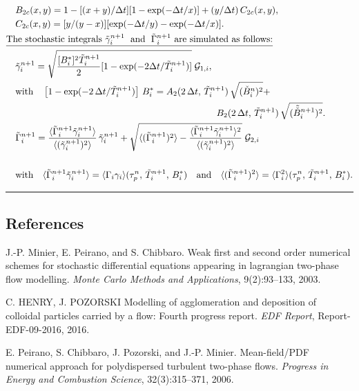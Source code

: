 \begin{table}[htbp]
\begin{align}
& \quad B_{2c}(x,y) =  1 - [(x+y)/\Delta t][1-\exp(-\Delta t/x)]
+ (y/\Delta t)\,C_{2c}(x,y), \notag\\
& \quad C_{2c}(x,y) = [y/(y-x)][\exp(-\Delta t/y)-\exp(-\Delta
  t/x)].\notag \\
& \text{\underline{The stochastic integrals
        $\tilde{\gamma}_i^{n+1}\;$ \text{and} $\;\tilde{\Gamma}_i^{n+1}$
        are simulated as follows:}}\notag \\
& \quad \tilde{\gamma}_i^{n+1}= \sqrt {\frac{[B_i^{*}]^2\tilde{T}_i^{n+1}}{2}
               [1-\exp(-2\Delta t/\tilde{T}_i^{n+1})]}\; {\mathcal G}_{1,i},\notag \\
& \quad \text{with} \quad \left[1-\exp(-2\,\Delta t/\tilde{T}_i^{n+1})\right]\,B_i^{*} =
    A_2(2\,\Delta t,\,\tilde{T}_i^{n+1})\,\sqrt{(\Check{B}_i^n)^2} + \notag \\
& \hskip 8.0cm B_2(2\,\Delta t,\,\tilde{T}_i^{n+1})\,\sqrt{(\tilde{\Check{B}}_i^{n+1})^2}. \notag \\
& \quad \tilde{\Gamma}_i^{n+1} =
  \frac{\lra{ \tilde{\Gamma}_i^{n+1}\tilde{\gamma}_i^{n+1} } }
     {\lra{(\tilde{\gamma}_i^{n+1})^2}}\,\tilde{\gamma}_i^{n+1}+
  \sqrt{\lra{(\tilde{\Gamma}_i^{n+1})^2}-
      \frac{\lra{\tilde{\Gamma}_i^{n+1}\tilde{\gamma}_i^{n+1}}^2}
           {\lra{(\tilde{\gamma}_i^{n+1})^2}} }\;{\mathcal G}_{2,i} \notag \\ \notag \\
& \quad \text{with}\quad \lra{ \tilde{\Gamma}_i^{n+1}\tilde{\gamma}_i^{n+1} } =
  \lra{\Gamma_i\gamma_i}(\tau_p^n,\,\tilde{T}_i^{n+1},\,B^{*}_i)
  \quad \text{and}\quad \lra{(\tilde{\Gamma}_i^{n+1})^2} =
  \lra{\Gamma_i^2}(\tau_p^n,\,\tilde{T}_i^{n+1},\,B^{*}_i). \notag
\end{align}
\hrule
\label{tab:lagrangian:sch2}
\end{table}

\clearpage

\subsection{References}

\begin{thebibliography}{3}

    J.-P. Minier, E. Peirano, and S. Chibbaro. Weak first
   and second order numerical schemes for stochastic differential equations
   appearing in lagrangian two-phase flow modelling.
   {\it Monte Carlo Methods and Applications}, 9(2):93–133, 2003.

    C. HENRY, J. POZORSKI
   Modelling of agglomeration and deposition of colloidal particles carried by a flow: Fourth progress report.
   {\it EDF Report}, Report-EDF-09-2016, 2016.
   
    E. Peirano, S. Chibbaro, J. Pozorski, and J.-P. Minier.
   Mean-field/PDF numerical approach for polydispersed turbulent two-phase flows.
   {\it Progress in Energy and Combustion Science}, 32(3):315–371, 2006.

\end{thebibliography}

